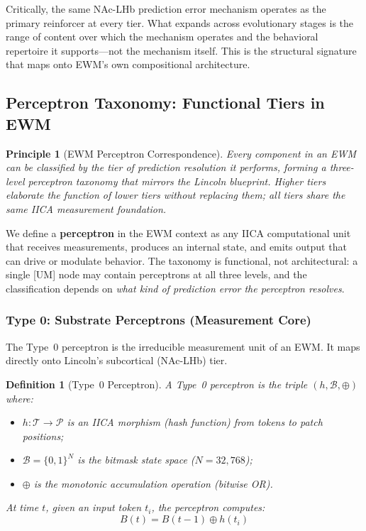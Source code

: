\documentclass[11pt,a4paper]{article}
\newtheorem{principle}{Principle}[section]
\newtheorem{definition}{Definition}[section]
\theoremstyle{remark}
\begin{document}
Critically, the same NAc-LHb prediction error mechanism operates as the primary
reinforcer at every tier. What expands across evolutionary stages is the range
of content over which the mechanism operates and the behavioral repertoire it
supports---not the mechanism itself. This is the structural signature that maps
onto EWM's own compositional architecture.

\subsection{Perceptron Taxonomy: Functional Tiers in EWM}
\label{sec:perceptron-taxonomy}

\begin{principle}[EWM Perceptron Correspondence]
\label{prin:perceptron}
Every component in an EWM can be classified by the tier of prediction
resolution it performs, forming a three-level perceptron taxonomy that mirrors
the Lincoln blueprint. Higher tiers elaborate the function of lower tiers
without replacing them; all tiers share the same IICA measurement foundation.
\end{principle}

We define a \textbf{perceptron} in the EWM context as any IICA computational
unit that receives measurements, produces an internal state, and emits output
that can drive or modulate behavior. The taxonomy is functional, not
architectural: a single [UM] node may contain perceptrons at all three levels,
and the classification depends on \textit{what kind of prediction error the
perceptron resolves}.

\subsubsection{Type 0: Substrate Perceptrons (Measurement Core)}

The Type~0 perceptron is the irreducible measurement unit of an EWM. It maps
directly onto Lincoln's subcortical (NAc-LHb) tier.

\begin{definition}[Type~0 Perceptron]
A Type~0 perceptron is the triple $(h, \mathcal{B}, \oplus)$ where:
\begin{itemize}[leftmargin=*,nosep]
  \item $h: \mathcal{T} \to \mathcal{P}$ is an IICA morphism (hash function)
    from tokens to patch positions;
  \item $\mathcal{B} = \{0, 1\}^N$ is the bitmask state space ($N =
    32{,}768$);
  \item $\oplus$ is the monotonic accumulation operation (bitwise OR).
\end{itemize}
At time $t$, given an input token $t_i$, the perceptron computes:
\begin{equation}
  B(t) = B(t-1) \oplus h(t_i)
\end{equation}
\end{definition}
\end{document}
